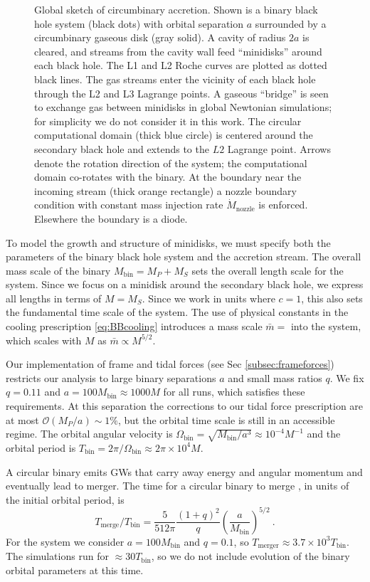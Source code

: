 \documentclass{emulateapj}
\newcommand{\Om}{\Omega}
\newcommand{\OO}{\mathcal{O}}
\begin{document}
\begin{figure}
\caption{\label{fi:domain} Global sketch of circumbinary accretion.  Shown is a binary black hole system (black dots) with orbital separation $a$ surrounded by a circumbinary gaseous disk (gray solid).  A cavity of radius $2a$ is cleared, and streams from the cavity wall feed ``minidisks'' around each black hole. The L1 and L2 Roche curves are plotted as dotted black lines.  The gas streams enter the vicinity of each black hole through the L2 and L3 Lagrange points.  A gaseous ``bridge'' is seen to exchange gas between minidisks in global Newtonian simulations; for simplicity we do not consider it in this work.  The circular computational domain (thick blue circle) is centered around the secondary black hole and extends to the $L2$ Lagrange point.  Arrows denote the rotation direction of the system; the computational domain co-rotates with the binary.  At the boundary near the incoming stream (thick orange rectangle) a nozzle boundary condition with constant mass injection rate $\dot{M}_\text{nozzle}$ is enforced.  Elsewhere the boundary is a diode.} 
\end{figure}

To model the growth and structure of minidisks, we must specify both the parameters of the binary black hole system and the accretion stream.  The overall mass scale of the binary $M_\text{bin} = M_P+M_S$ sets the overall length scale for the system.  Since we focus on a minidisk around the secondary black hole, we express all lengths in terms of $M = M_S$.  Since we work in units where $c=1$, this also sets the fundamental time scale of the system. The use of physical constants in the cooling prescription \eqref{eq:BBcooling} introduces a mass scale $\bar{m}=$ into the system, which scales with $M$ as $\bar{m} \propto M^{5/2}$.  

Our implementation of frame and tidal forces (see Sec \ref{subsec:frameforces}) restricts our analysis to large binary separations $a$ and small mass ratios $q$.  We fix $q=0.11$ and $a = 100 M_\text{bin} \approx 1000 M$ for all runs, which satisfies these requirements.  At this separation the corrections to our tidal force prescription are at most $\OO({M_P / a}) \sim 1\%$, but the orbital time scale is still in an accessible regime.  The orbital angular velocity is $\Om_\text{bin} = \sqrt{M_\text{bin} / a^3} \approx 10^{-4} M^{-1}$ and the orbital period is $T_\text{bin} = 2\pi / \Om_\text{bin} \approx 2 \pi \times 10^4 M$.

A circular binary emits GWs that carry away energy and angular momentum and eventually lead to merger.  The time for a circular binary to merge \citep{Peters64}, in units of the initial orbital period, is
\begin{equation}
	T_\text{merge} / T_\text{bin} = \frac{5}{512 \pi}\frac{(1+q)^2}{q} \left(\frac{a}{M_\text{bin}}\right)^{5/2} \ . \label{eq:Tmerge}
\end{equation}
For the system we consider $a=100 M_\text{bin}$ and $q=0.1$, so $T_\text{merger} \approx 3.7\times 10^3 T_\text{bin}$.  The simulations run for $\approx 30 T_\text{bin}$, so we do not include evolution of the binary orbital parameters at this time.
\end{document}

